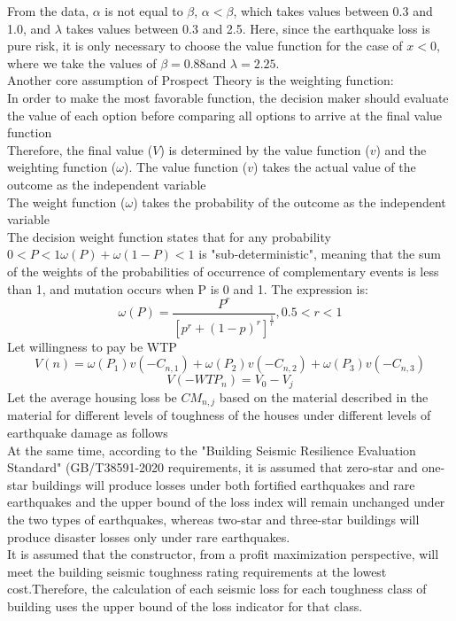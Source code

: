 \documentclass{mcmthesis}
\begin{document}
From the data, $\alpha$ \cite{1}is not equal to $\beta$\cite{2}, $\alpha<\beta$, which takes values between 0.3 and 1.0, and $\lambda$ takes values between 0.3 and 2.5. Here, since the earthquake loss is pure risk, it is only necessary to choose the value function for the case of $x<0$, where we take the values of $\beta=0.88 $and $\lambda=2.25$.\cite{3}\\
Another core assumption of Prospect Theory is the weighting function: \\
In order to make the most favorable function, the decision maker should evaluate the value of each option before comparing all options to arrive at the final value function\\
Therefore, the final value ($V$) is determined by the value function ($v$) and the weighting function ($\omega$).
The value function ($v$) takes the actual value of the outcome as the independent variable\\
The weight function ($\omega$) takes the probability of the outcome as the independent variable \\
The decision weight function states that for any probability $0<P<1 \omega(P)+\omega(1-P)<1$ is "sub-deterministic", meaning that the sum of the weights of the probabilities of occurrence of complementary events is less than 1, and mutation occurs when P is 0 and 1.
The expression is:
$$
\omega \left( P \right) =\frac{P^r}{\left[ p^r+\left( 1-p \right) ^r \right] ^{\frac{1}{r}}},0.5<r<1
$$
Let willingness to pay be WTP\cite{4}\\
$$
V(n)=\omega\left(P_1\right) v\left(-C_{n, 1}\right)+\omega\left(P_2\right) v\left(-C_{n, 2}\right)+\omega\left(P_3\right) v\left(-C_{n, 3}\right)
$$
$$V\left(-W T P_n\right)=V_0-V_j$$
Let the average housing loss be $CM_{n,j}$ based on the material described in the material for different levels of toughness of the houses under different levels of earthquake damage as follows\\
At the same time, according to the "Building Seismic Resilience Evaluation Standard" (GB/T38591-2020 requirements, it is assumed that zero-star and one-star buildings will produce losses under both fortified earthquakes and rare earthquakes and the upper bound of the loss index will remain unchanged under the two types of earthquakes, whereas two-star and three-star buildings will produce disaster losses only under rare earthquakes.\\
It is assumed that the constructor, from a profit maximization perspective, will meet the building seismic toughness rating requirements at the lowest cost.Therefore, the calculation of each seismic loss for each toughness class of building uses the upper bound of the loss indicator for that class.\\
\end{document}
